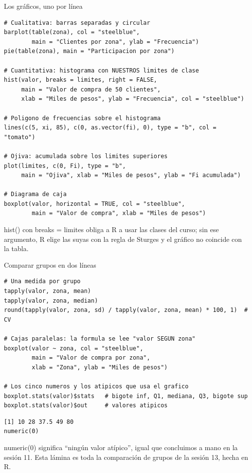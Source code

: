 \documentclass[aspectratio=169,10pt]{beamer}
\newcommand{\fx}[1]{{\ttfamily\color{uniAzul}#1}}
\begin{document}
\begin{frame}[fragile]{Los gráficos, uno por línea}
  \footnotesize
\begin{lstlisting}[style=Rmini]
# Cualitativa: barras separadas y circular
barplot(table(zona), col = "steelblue",
        main = "Clientes por zona", ylab = "Frecuencia")
pie(table(zona), main = "Participacion por zona")

# Cuantitativa: histograma con NUESTROS limites de clase
hist(valor, breaks = limites, right = FALSE,
     main = "Valor de compra de 50 clientes",
     xlab = "Miles de pesos", ylab = "Frecuencia", col = "steelblue")

# Poligono de frecuencias sobre el histograma
lines(c(5, xi, 85), c(0, as.vector(fi), 0), type = "b", col = "tomato")

# Ojiva: acumulada sobre los limites superiores
plot(limites, c(0, Fi), type = "b",
     main = "Ojiva", xlab = "Miles de pesos", ylab = "Fi acumulada")

# Diagrama de caja
boxplot(valor, horizontal = TRUE, col = "steelblue",
        main = "Valor de compra", xlab = "Miles de pesos")
\end{lstlisting}

  \vspace{-0.12cm}
  {\tiny\color{uniGris} \fx{hist()} con \fx{breaks = limites} obliga a R a usar
  las clases del curso; sin ese argumento, R elige las suyas con la regla de
  Sturges y el gráfico no coincide con la tabla.}
\end{frame}

\begin{frame}[fragile]{Comparar grupos en dos líneas}
  \footnotesize
\begin{lstlisting}[style=Rcode]
# Una medida por grupo
tapply(valor, zona, mean)
tapply(valor, zona, median)
round(tapply(valor, zona, sd) / tapply(valor, zona, mean) * 100, 1)  # CV

# Cajas paralelas: la formula se lee "valor SEGUN zona"
boxplot(valor ~ zona, col = "steelblue",
        main = "Valor de compra por zona",
        xlab = "Zona", ylab = "Miles de pesos")

# Los cinco numeros y los atipicos que usa el grafico
boxplot.stats(valor)$stats   # bigote inf, Q1, mediana, Q3, bigote sup
boxplot.stats(valor)$out     # valores atipicos
\end{lstlisting}
\begin{lstlisting}[style=Rout]
[1] 10 28 37.5 49 80
numeric(0)
\end{lstlisting}

  \vspace{-0.12cm}
  {\tiny\color{uniGris} \fx{numeric(0)} significa ``ningún valor atípico'',
  igual que concluimos a mano en la sesión 11. Esta lámina es toda la
  comparación de grupos de la sesión 13, hecha en R.}
\end{frame}
\end{document}
